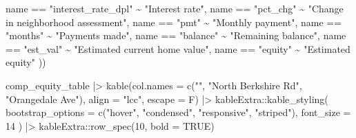 \documentclass[
  letterpaper,
  DIV=11,
  numbers=noendperiod]{scrartcl}
\newenvironment{Shaded}{\begin{snugshade}}{\end{snugshade}}
\newcommand{\AttributeTok}[1]{\textcolor[rgb]{0.40,0.45,0.13}{#1}}
\newcommand{\ConstantTok}[1]{\textcolor[rgb]{0.56,0.35,0.01}{#1}}
\newcommand{\DecValTok}[1]{\textcolor[rgb]{0.68,0.00,0.00}{#1}}
\newcommand{\FunctionTok}[1]{\textcolor[rgb]{0.28,0.35,0.67}{#1}}
\newcommand{\NormalTok}[1]{\textcolor[rgb]{0.00,0.23,0.31}{#1}}
\newcommand{\SpecialCharTok}[1]{\textcolor[rgb]{0.37,0.37,0.37}{#1}}
\newcommand{\StringTok}[1]{\textcolor[rgb]{0.13,0.47,0.30}{#1}}
\begin{document}
\begin{Shaded}
\begin{Highlighting}[]
\NormalTok{    name }\SpecialCharTok{==} \StringTok{"interest\_rate\_dpl"} \SpecialCharTok{\textasciitilde{}} \StringTok{"Interest rate"}\NormalTok{,}
\NormalTok{    name }\SpecialCharTok{==} \StringTok{"pct\_chg"} \SpecialCharTok{\textasciitilde{}} \StringTok{"Change in neighborhood assessment"}\NormalTok{,}
\NormalTok{    name }\SpecialCharTok{==} \StringTok{"pmt"} \SpecialCharTok{\textasciitilde{}} \StringTok{"Monthly payment"}\NormalTok{,}
\NormalTok{    name }\SpecialCharTok{==} \StringTok{"months"} \SpecialCharTok{\textasciitilde{}} \StringTok{"Payments made"}\NormalTok{,}
\NormalTok{    name }\SpecialCharTok{==} \StringTok{"balance"} \SpecialCharTok{\textasciitilde{}} \StringTok{"Remaining balance"}\NormalTok{,}
\NormalTok{    name }\SpecialCharTok{==} \StringTok{"est\_val"} \SpecialCharTok{\textasciitilde{}} \StringTok{"Estimated current home value"}\NormalTok{,}
\NormalTok{    name }\SpecialCharTok{==} \StringTok{"equity"} \SpecialCharTok{\textasciitilde{}} \StringTok{"Estimated equity"}
\NormalTok{  ))}

\NormalTok{comp\_equity\_table }\SpecialCharTok{|\textgreater{}} 
  \FunctionTok{kable}\NormalTok{(}\AttributeTok{col.names =} \FunctionTok{c}\NormalTok{(}\StringTok{""}\NormalTok{, }\StringTok{"North Berkshire Rd"}\NormalTok{, }\StringTok{"Orangedale Ave"}\NormalTok{),}
        \AttributeTok{align =} \StringTok{"lcc"}\NormalTok{,}
        \AttributeTok{escape =}\NormalTok{ F) }\SpecialCharTok{|\textgreater{}} 
\NormalTok{  kableExtra}\SpecialCharTok{::}\FunctionTok{kable\_styling}\NormalTok{(}
   \AttributeTok{bootstrap\_options =} \FunctionTok{c}\NormalTok{(}\StringTok{"hover"}\NormalTok{, }\StringTok{"condensed"}\NormalTok{, }\StringTok{"responsive"}\NormalTok{, }\StringTok{"striped"}\NormalTok{),}
   \AttributeTok{font\_size =} \DecValTok{14}
\NormalTok{  ) }\SpecialCharTok{|\textgreater{}} 
\NormalTok{  kableExtra}\SpecialCharTok{::}\FunctionTok{row\_spec}\NormalTok{(}\DecValTok{10}\NormalTok{, }\AttributeTok{bold =} \ConstantTok{TRUE}\NormalTok{)}
\end{Highlighting}
\end{Shaded}
\end{document}
